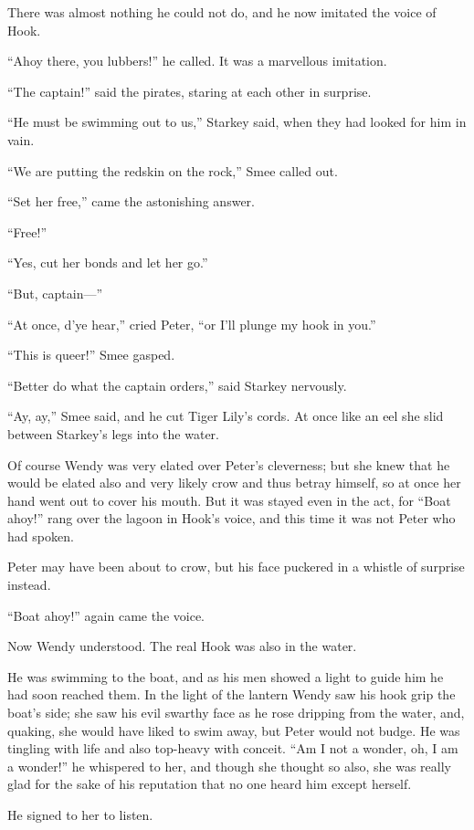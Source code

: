 There was almost nothing he could not do, and he now imitated the voice
of Hook.

``Ahoy there, you lubbers!'' he called. It was a marvellous imitation.

``The captain!'' said the pirates, staring at each other in surprise.

``He must be swimming out to us,'' Starkey said, when they had looked for
him in vain.

``We are putting the redskin on the rock,'' Smee called out.

``Set her free,'' came the astonishing answer.

``Free!''

``Yes, cut her bonds and let her go.''

``But, captain—''

``At once, d'ye hear,'' cried Peter, ``or I'll plunge my hook in you.''

``This is queer!'' Smee gasped.

``Better do what the captain orders,'' said Starkey nervously.

``Ay, ay,'' Smee said, and he cut Tiger Lily's cords. At once like an eel
she slid between Starkey's legs into the water.

Of course Wendy was very elated over Peter's cleverness; but she knew
that he would be elated also and very likely crow and thus betray
himself, so at once her hand went out to cover his mouth. But it was
stayed even in the act, for ``Boat ahoy!'' rang over the lagoon in Hook's
voice, and this time it was not Peter who had spoken.

Peter may have been about to crow, but his face puckered in a whistle
of surprise instead.

``Boat ahoy!'' again came the voice.

Now Wendy understood. The real Hook was also in the water.

He was swimming to the boat, and as his men showed a light to guide him
he had soon reached them. In the light of the lantern Wendy saw his
hook grip the boat's side; she saw his evil swarthy face as he rose
dripping from the water, and, quaking, she would have liked to swim
away, but Peter would not budge. He was tingling with life and also
top-heavy with conceit. ``Am I not a wonder, oh, I am a wonder!'' he
whispered to her, and though she thought so also, she was really glad
for the sake of his reputation that no one heard him except herself.

He signed to her to listen.

